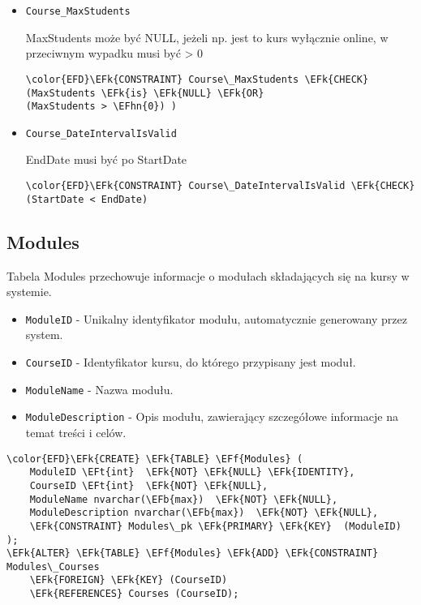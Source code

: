 \documentclass[11pt]{article}
\newcommand{\EFk}[1]{\textcolor{EFk}{\textbf{#1}}} %
\newcommand{\EFb}[1]{\textcolor{EFb}{\textbf{#1}}} %
\newcommand{\EFf}[1]{\textcolor{EFf}{#1}} %
\newcommand{\EFt}[1]{\textcolor{EFt}{\textbf{#1}}} %
\newcommand{\EFhn}[1]{\textcolor{EFhn}{#1}} %
\begin{document}
\begin{itemize}
\item \texttt{Course\_MaxStudents}

MaxStudents może być NULL, jeżeli np. jest to kurs wyłącznie online, w przeciwnym wypadku musi być > 0
\begin{Code}
\begin{Verbatim}
\color{EFD}\EFk{CONSTRAINT} Course\_MaxStudents \EFk{CHECK}
(MaxStudents \EFk{is} \EFk{NULL} \EFk{OR}
(MaxStudents > \EFhn{0}) )
\end{Verbatim}
\end{Code}
\item \texttt{Course\_DateIntervalIsValid}

EndDate musi być po StartDate
\begin{Code}
\begin{Verbatim}
\color{EFD}\EFk{CONSTRAINT} Course\_DateIntervalIsValid \EFk{CHECK}
(StartDate < EndDate)
\end{Verbatim}
\end{Code}
\end{itemize}
\subsection{Modules}
\label{sec:org794543b}
Tabela Modules przechowuje informacje o modułach składających się na kursy w systemie.
\begin{itemize}
\item \texttt{ModuleID} - Unikalny identyfikator modułu, automatycznie generowany przez system.
\item \texttt{CourseID} - Identyfikator kursu, do którego przypisany jest moduł.
\item \texttt{ModuleName} - Nazwa modułu.
\item \texttt{ModuleDescription} - Opis modułu, zawierający szczegółowe informacje na temat treści i celów.
\end{itemize}
\begin{Code}
\begin{Verbatim}
\color{EFD}\EFk{CREATE} \EFk{TABLE} \EFf{Modules} (
    ModuleID \EFt{int}  \EFk{NOT} \EFk{NULL} \EFk{IDENTITY},
    CourseID \EFt{int}  \EFk{NOT} \EFk{NULL},
    ModuleName nvarchar(\EFb{max})  \EFk{NOT} \EFk{NULL},
    ModuleDescription nvarchar(\EFb{max})  \EFk{NOT} \EFk{NULL},
    \EFk{CONSTRAINT} Modules\_pk \EFk{PRIMARY} \EFk{KEY}  (ModuleID)
);
\EFk{ALTER} \EFk{TABLE} \EFf{Modules} \EFk{ADD} \EFk{CONSTRAINT} Modules\_Courses
    \EFk{FOREIGN} \EFk{KEY} (CourseID)
    \EFk{REFERENCES} Courses (CourseID);
\end{Verbatim}
\end{Code}
\end{document}
